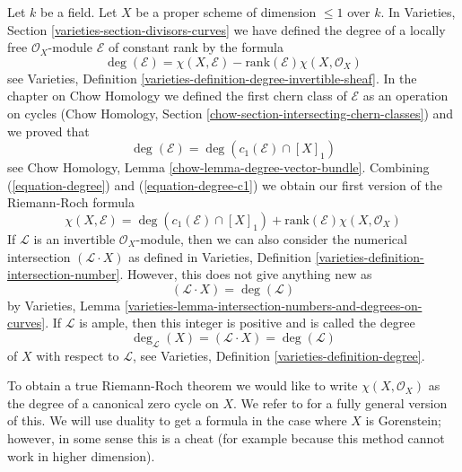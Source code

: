 \noindent
Let $k$ be a field. Let $X$ be a proper scheme of dimension $\leq 1$
over $k$. In Varieties, Section \ref{varieties-section-divisors-curves}
we have defined the degree of a locally free $\mathcal{O}_X$-module
$\mathcal{E}$ of constant rank by the formula
\begin{equation}
\label{equation-degree}
\deg(\mathcal{E}) =
\chi(X, \mathcal{E}) - \text{rank}(\mathcal{E})\chi(X, \mathcal{O}_X)
\end{equation}
see Varieties, Definition \ref{varieties-definition-degree-invertible-sheaf}.
In the chapter on Chow Homology we defined the first chern class of
$\mathcal{E}$ as an operation on cycles
(Chow Homology, Section
\ref{chow-section-intersecting-chern-classes}) and we proved that
\begin{equation}
\label{equation-degree-c1}
\deg(\mathcal{E}) = \deg(c_1(\mathcal{E}) \cap [X]_1)
\end{equation}
see Chow Homology, Lemma \ref{chow-lemma-degree-vector-bundle}.
Combining (\ref{equation-degree}) and (\ref{equation-degree-c1})
we obtain our first version of the Riemann-Roch formula
\begin{equation}
\label{equation-rr}
\chi(X, \mathcal{E}) =
\deg(c_1(\mathcal{E}) \cap [X]_1) +
\text{rank}(\mathcal{E})\chi(X, \mathcal{O}_X)
\end{equation}
If $\mathcal{L}$ is an invertible $\mathcal{O}_X$-module, then
we can also consider the numerical intersection
$(\mathcal{L} \cdot X)$ as defined in
Varieties, Definition \ref{varieties-definition-intersection-number}.
However, this does not give anything new as
\begin{equation}
\label{equation-numerical-degree}
(\mathcal{L} \cdot X) = \deg(\mathcal{L})
\end{equation}
by Varieties, Lemma
\ref{varieties-lemma-intersection-numbers-and-degrees-on-curves}. If
$\mathcal{L}$ is ample, then this integer is positive and is
called the degree
\begin{equation}
\label{equation-degree-X}
\deg_\mathcal{L}(X) = (\mathcal{L} \cdot X) = \deg(\mathcal{L})
\end{equation}
of $X$ with respect to $\mathcal{L}$, see
Varieties, Definition \ref{varieties-definition-degree}.

\medskip\noindent
To obtain a true Riemann-Roch theorem we would like to write
$\chi(X, \mathcal{O}_X)$ as the degree of a canonical zero cycle on $X$.
We refer to \cite{F} for a fully general version of this. We will use
duality to get a formula in the case where $X$ is Gorenstein; however,
in some sense this is a cheat (for example because this method cannot
work in higher dimension).

